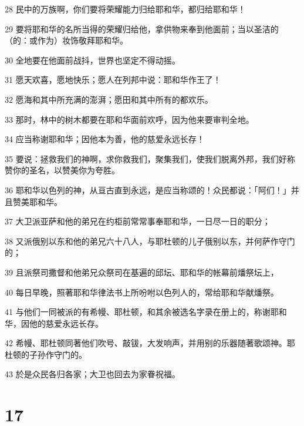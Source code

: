 \par 28 民中的万族啊，你们要将荣耀能力归给耶和华，都归给耶和华！
\par 29 要将耶和华的名所当得的荣耀归给他，拿供物来奉到他面前；当以圣洁的（的：或作为）妆饰敬拜耶和华。
\par 30 全地要在他面前战抖，世界也坚定不得动摇。
\par 31 愿天欢喜，愿地快乐；愿人在列邦中说：耶和华作王了！
\par 32 愿海和其中所充满的澎湃；愿田和其中所有的都欢乐。
\par 33 那时，林中的树木都要在耶和华面前欢呼，因为他来要审判全地。
\par 34 应当称谢耶和华；因他本为善，他的慈爱永远长存！
\par 35 要说：拯救我们的神啊，求你救我们，聚集我们，使我们脱离外邦，我们好称赞你的圣名，以赞美你为夸胜。
\par 36 耶和华以色列的神，从亘古直到永远，是应当称颂的！众民都说：「阿们！」并且赞美耶和华。
\par 37 大卫派亚萨和他的弟兄在约柜前常常事奉耶和华，一日尽一日的职分；
\par 38 又派俄别以东和他的弟兄六十八人，与耶杜顿的儿子俄别以东，并何萨作守门的；
\par 39 且派祭司撒督和他弟兄众祭司在基遍的邱坛、耶和华的帐幕前燔祭坛上，
\par 40 每日早晚，照著耶和华律法书上所吩咐以色列人的，常给耶和华献燔祭。
\par 41 与他们一同被派的有希幔、耶杜顿，和其余被选名字录在册上的，称谢耶和华，因他的慈爱永远长存。
\par 42 希幔、耶杜顿同著他们吹号、敲钹，大发响声，并用别的乐器随著歌颂神。耶杜顿的子孙作守门的。
\par 43 於是众民各归各家；大卫也回去为家眷祝福。

\chapter{17}

